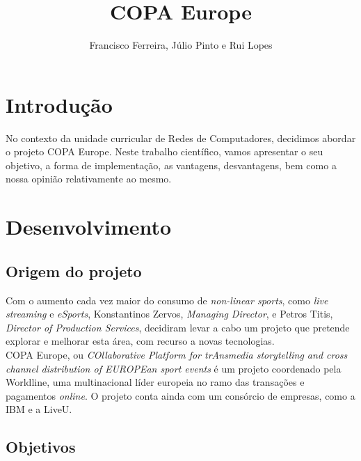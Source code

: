 \documentclass{llncs}
\begin{document}
\mainmatter

\title{COPA Europe}

\author{Francisco Ferreira, Júlio Pinto e Rui Lopes}


\date{}


\maketitle

\section{Introdução}
No contexto da unidade curricular de Redes de Computadores, decidimos abordar o projeto COPA Europe. Neste trabalho científico, vamos apresentar o seu objetivo, a forma de implementação, as vantagens, desvantagens, bem como a nossa opinião relativamente ao mesmo.

\section{Desenvolvimento}

\subsection{Origem do projeto}

Com o aumento cada vez maior do consumo de \emph{non-linear sports}, como \emph{live streaming} e \emph{eSports}, Konstantinos Zervos, \emph{Managing Director}, e Petros Titis, \emph{Director of Production Services}, decidiram levar a cabo um projeto que pretende explorar e melhorar esta área, com recurso a novas tecnologias. 
\\
COPA Europe, ou \textit{COllaborative Platform for trAnsmedia storytelling and cross channel distribution of EUROPEan sport events} é um projeto coordenado pela Worldline, uma multinacional líder europeia no ramo das transações e pagamentos \emph{online}. O projeto conta ainda com um consórcio de empresas, como a IBM e a LiveU.

\subsection{Objetivos}
\end{document}
